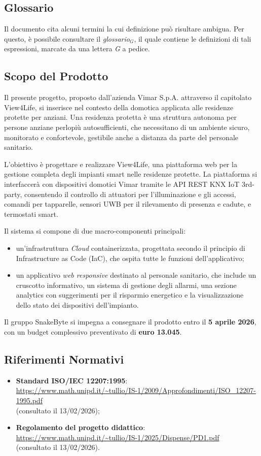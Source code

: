 \documentclass[10pt, letterpaper]{article}
\begin{document}
\subsection{Glossario}
Il documento cita alcuni termini la cui definizione può risultare ambigua. Per questo, è possibile consultare il \textit{glossario$_{G}$}, il quale contiene le definizioni di tali espressioni, marcate da una lettera \textit{G} a pedice.

\subsection{Scopo del Prodotto}
Il presente progetto, proposto dall'azienda Vimar S.p.A. attraverso il capitolato View4Life, si inserisce nel contesto della domotica applicata alle residenze protette per anziani. Una residenza protetta è una struttura autonoma per persone anziane perlopiù autosufficienti, che necessitano di un ambiente sicuro, monitorato e confortevole, gestibile anche a distanza da parte del personale sanitario.

L'obiettivo è progettare e realizzare View4Life, una piattaforma web per la gestione completa degli impianti smart nelle residenze protette. La piattaforma si interfaccerà con dispositivi domotici Vimar tramite le API REST KNX IoT 3rd-party, consentendo il controllo di attuatori per l'illuminazione e gli accessi, comandi per tapparelle, sensori UWB per il rilevamento di presenza e cadute, e termostati smart.

Il sistema si compone di due macro-componenti principali:
\begin{itemize}
    \item un'infrastruttura \textit{Cloud} containerizzata, progettata secondo il principio di Infrastructure as Code (IaC), che ospita tutte le funzioni dell'applicativo;
    \item un applicativo \textit{web responsive} destinato al personale sanitario, che include un cruscotto informativo, un sistema di gestione degli allarmi, una sezione analytics con suggerimenti per il risparmio energetico e la visualizzazione dello stato dei dispositivi dell'impianto.
\end{itemize}
Il gruppo SnakeByte si impegna a consegnare il prodotto entro il \textbf{5 aprile 2026}, con un budget complessivo preventivato di \textbf{euro 13.045}.

\subsection{Riferimenti Normativi}
\begin{itemize}
    \item \textbf{Standard ISO/IEC 12207:1995}:
        \\ \url{https://www.math.unipd.it/~tullio/IS-1/2009/Approfondimenti/ISO_12207-1995.pdf}
        \\ (consultato il 13/02/2026);
    \item \textbf{Regolamento del progetto didattico}:
        \\ \url{https://www.math.unipd.it/~tullio/IS-1/2025/Dispense/PD1.pdf}
        \\ (consultato il 13/02/2026).
\end{itemize}
\end{document}
